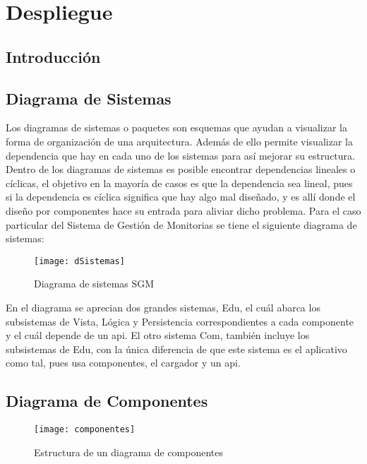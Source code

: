 \chapter{Despliegue}

\section{Introducción}

\newpage

\section{Diagrama de Sistemas}

Los diagramas de sistemas o paquetes son esquemas que ayudan a visualizar la forma de organización de una arquitectura. Además de ello permite visualizar la dependencia que hay en cada uno de los sistemas para así mejorar su estructura. Dentro de los diagramas de sistemas es posible encontrar dependencias lineales o cíclicas, el objetivo en la mayoría de casos es que la dependencia sea lineal, pues si la dependencia es cíclica significa que hay algo mal diseñado, y es allí donde el diseño por componentes hace su entrada para aliviar dicho problema. 
Para el caso particular del Sistema de Gestión de Monitorias se tiene el siguiente diagrama de sistemas:

\begin{figure}[H]
	\centering
	\texttt{[image: dSistemas]}
	\centering
	\caption{Diagrama de sistemas SGM}
	\label{fig:dSistemas}
\end{figure}

En el diagrama se aprecian dos grandes sistemas, Edu, el cuál abarca los subsistemas de Vista, Lógica y Persistencia correspondientes a cada componente y el cuál depende de un api. El otro sistema Com, también incluye los subsistemas de Edu, con la única diferencia de que este sistema es el aplicativo como tal, pues usa componentes, el cargador y un api.

\newpage

\section{Diagrama de Componentes}
\begin{figure}[H]
	\centering
	\texttt{[image: componentes]}
	\centering
	\caption{Estructura de un diagrama de componentes}
	\label{fig:componentes}
\end{figure}

